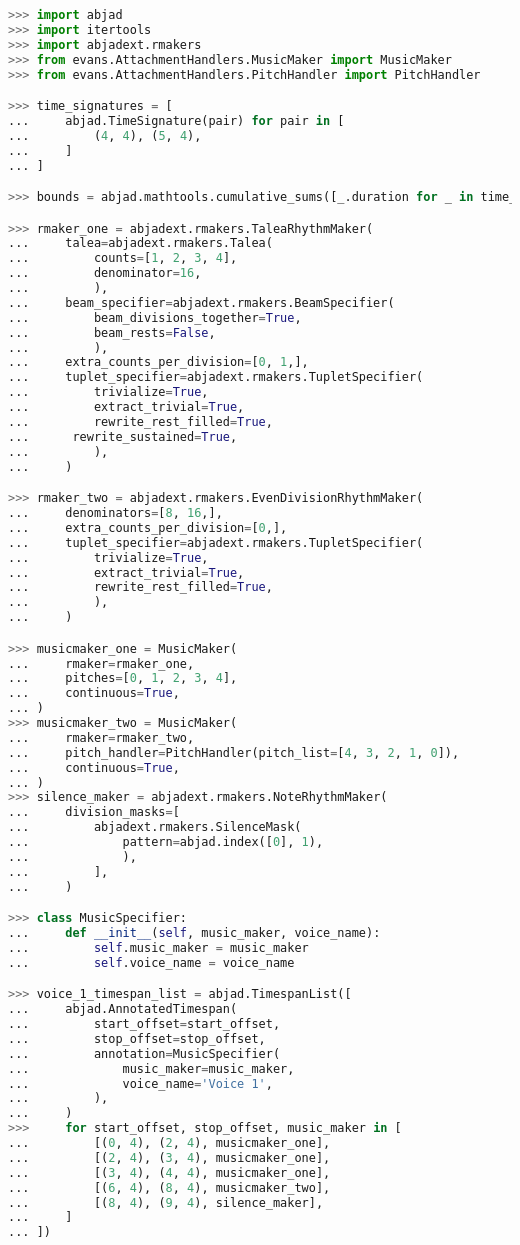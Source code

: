 \singlespace
\begin{lstlisting}[language=Python, caption=Using MusicMaker with PitchHandler]
>>> import abjad
>>> import itertools
>>> import abjadext.rmakers
>>> from evans.AttachmentHandlers.MusicMaker import MusicMaker
>>> from evans.AttachmentHandlers.PitchHandler import PitchHandler

>>> time_signatures = [
...     abjad.TimeSignature(pair) for pair in [
...         (4, 4), (5, 4),
...     ]
... ]

>>> bounds = abjad.mathtools.cumulative_sums([_.duration for _ in time_signatures])

>>> rmaker_one = abjadext.rmakers.TaleaRhythmMaker(
...     talea=abjadext.rmakers.Talea(
...         counts=[1, 2, 3, 4],
...         denominator=16,
...         ),
...     beam_specifier=abjadext.rmakers.BeamSpecifier(
...         beam_divisions_together=True,
...         beam_rests=False,
...         ),
...     extra_counts_per_division=[0, 1,],
...     tuplet_specifier=abjadext.rmakers.TupletSpecifier(
...         trivialize=True,
...         extract_trivial=True,
...         rewrite_rest_filled=True,
...		 rewrite_sustained=True,
...         ),
...     )

>>> rmaker_two = abjadext.rmakers.EvenDivisionRhythmMaker(
...     denominators=[8, 16,],
...     extra_counts_per_division=[0,],
...     tuplet_specifier=abjadext.rmakers.TupletSpecifier(
...         trivialize=True,
...         extract_trivial=True,
...         rewrite_rest_filled=True,
...         ),
...     )

>>> musicmaker_one = MusicMaker(
...     rmaker=rmaker_one,
...     pitches=[0, 1, 2, 3, 4],
...     continuous=True,
... )
>>> musicmaker_two = MusicMaker(
...     rmaker=rmaker_two,
...     pitch_handler=PitchHandler(pitch_list=[4, 3, 2, 1, 0]),
...     continuous=True,
... )
>>> silence_maker = abjadext.rmakers.NoteRhythmMaker(
...     division_masks=[
...         abjadext.rmakers.SilenceMask(
...             pattern=abjad.index([0], 1),
...             ),
...         ],
...     )

>>> class MusicSpecifier:
...     def __init__(self, music_maker, voice_name):
...         self.music_maker = music_maker
...         self.voice_name = voice_name

>>> voice_1_timespan_list = abjad.TimespanList([
...     abjad.AnnotatedTimespan(
...         start_offset=start_offset,
...         stop_offset=stop_offset,
...         annotation=MusicSpecifier(
...             music_maker=music_maker,
...             voice_name='Voice 1',
...         ),
...     )
>>>     for start_offset, stop_offset, music_maker in [
...         [(0, 4), (2, 4), musicmaker_one],
...         [(2, 4), (3, 4), musicmaker_one],
...         [(3, 4), (4, 4), musicmaker_one],
...         [(6, 4), (8, 4), musicmaker_two],
...         [(8, 4), (9, 4), silence_maker],
...     ]
... ])


\end{lstlisting}
